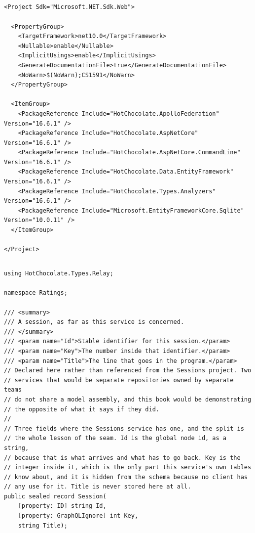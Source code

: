 \subsection*{}
\begin{verbatim}
<Project Sdk="Microsoft.NET.Sdk.Web">

  <PropertyGroup>
    <TargetFramework>net10.0</TargetFramework>
    <Nullable>enable</Nullable>
    <ImplicitUsings>enable</ImplicitUsings>
    <GenerateDocumentationFile>true</GenerateDocumentationFile>
    <NoWarn>$(NoWarn);CS1591</NoWarn>
  </PropertyGroup>

  <ItemGroup>
    <PackageReference Include="HotChocolate.ApolloFederation" Version="16.6.1" />
    <PackageReference Include="HotChocolate.AspNetCore" Version="16.6.1" />
    <PackageReference Include="HotChocolate.AspNetCore.CommandLine" Version="16.6.1" />
    <PackageReference Include="HotChocolate.Data.EntityFramework" Version="16.6.1" />
    <PackageReference Include="HotChocolate.Types.Analyzers" Version="16.6.1" />
    <PackageReference Include="Microsoft.EntityFrameworkCore.Sqlite" Version="10.0.11" />
  </ItemGroup>

</Project>
\end{verbatim}

\subsection*{}
\begin{verbatim}
using HotChocolate.Types.Relay;

namespace Ratings;

/// <summary>
/// A session, as far as this service is concerned.
/// </summary>
/// <param name="Id">Stable identifier for this session.</param>
/// <param name="Key">The number inside that identifier.</param>
/// <param name="Title">The line that goes in the program.</param>
// Declared here rather than referenced from the Sessions project. Two
// services that would be separate repositories owned by separate teams
// do not share a model assembly, and this book would be demonstrating
// the opposite of what it says if they did.
//
// Three fields where the Sessions service has one, and the split is
// the whole lesson of the seam. Id is the global node id, as a string,
// because that is what arrives and what has to go back. Key is the
// integer inside it, which is the only part this service's own tables
// know about, and it is hidden from the schema because no client has
// any use for it. Title is never stored here at all.
public sealed record Session(
    [property: ID] string Id,
    [property: GraphQLIgnore] int Key,
    string Title);
\end{verbatim}

